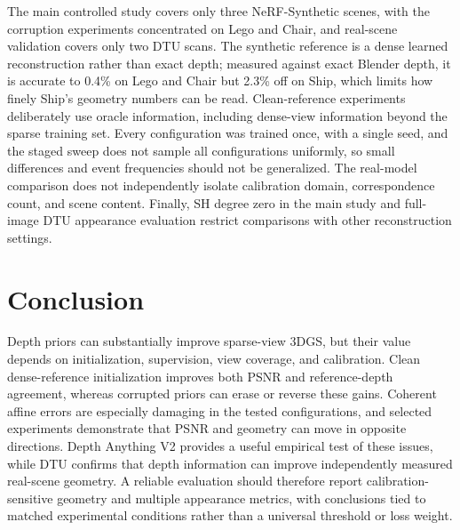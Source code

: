 \documentclass[10pt,a4paper]{article}
\begin{document}
The main controlled study covers only three NeRF-Synthetic scenes, with the corruption
experiments concentrated on Lego and Chair, and real-scene validation covers only two
DTU scans. The synthetic reference is a dense learned reconstruction rather than exact
depth; measured against exact Blender depth, it is accurate to 0.4\% on Lego and Chair
but 2.3\% off on Ship, which limits how finely Ship's geometry numbers can be read.
Clean-reference experiments deliberately use oracle information, including dense-view
information beyond the sparse training set. Every configuration was trained once, with
a single seed, and the staged sweep does not sample all configurations uniformly, so
small differences and event frequencies should not be generalized. The real-model
comparison does not independently isolate calibration domain, correspondence count,
and scene content. Finally, SH degree zero in the main study and full-image DTU
appearance evaluation restrict comparisons with other reconstruction settings.

\section{Conclusion}

Depth priors can substantially improve sparse-view 3DGS, but their value depends on
initialization, supervision, view coverage, and calibration. Clean dense-reference
initialization improves both PSNR and reference-depth agreement, whereas corrupted
priors can erase or reverse these gains. Coherent affine errors are especially
damaging in the tested configurations, and selected experiments demonstrate that PSNR
and geometry can move in opposite directions. Depth Anything V2 provides a useful
empirical test of these issues, while DTU confirms that depth information can improve
independently measured real-scene geometry. A reliable evaluation should therefore
report calibration-sensitive geometry and multiple appearance metrics, with
conclusions tied to matched experimental conditions rather than a universal threshold
or loss weight.
\end{document}
